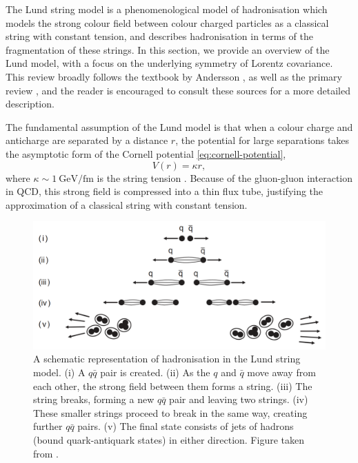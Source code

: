 \documentclass[12pt,a4paper]{report}
\begin{document}
The Lund string model is a phenomenological model of hadronisation which models the strong colour field between colour charged particles as a classical string with constant tension, and describes hadronisation in terms of the fragmentation of these strings. In this section, we provide an overview of the Lund model, with a focus on the underlying symmetry of Lorentz covariance. This review broadly follows the textbook by Andersson \cite{Andersson:1997xwk}, as well as the primary review \cite{Andersson:1983ia}, and the reader is encouraged to consult these sources for a more detailed description.

The fundamental assumption of the Lund model is that when a colour charge and anticharge are separated by a distance $r$, the potential for large separations takes the asymptotic form of the Cornell potential \eqref{eq:cornell-potential},
\begin{equation}
  V(r) = \kappa r,
\end{equation}
where $\kappa \sim \qty{1}{\giga\electronvolt\per\femto\meter}$ is the string tension \cite{Bali:1992ab}. Because of the gluon-gluon interaction in QCD, this strong field is compressed into a thin flux tube, justifying the approximation of a classical string with constant tension.

\begin{figure}
  \centering
  \includegraphics[width=0.8\linewidth]{figures/lund-hadronisation.png}
  \caption{A schematic representation of hadronisation in the Lund string model. (i) A $q\bar{q}$ pair is created. (ii) As the $q$ and $\bar{q}$ move away from each other, the strong field between them forms a string. (iii) The string breaks, forming a new $q\bar{q}$ pair and leaving two strings. (iv) These smaller strings proceed to break in the same way, creating further $q\bar{q}$ pairs. (v) The final state consists of jets of hadrons (bound quark-antiquark states) in either direction. Figure taken from \cite{Thomson:2013zua}.}
  \label{fig:lund-hadronisation}
\end{figure}
\end{document}
